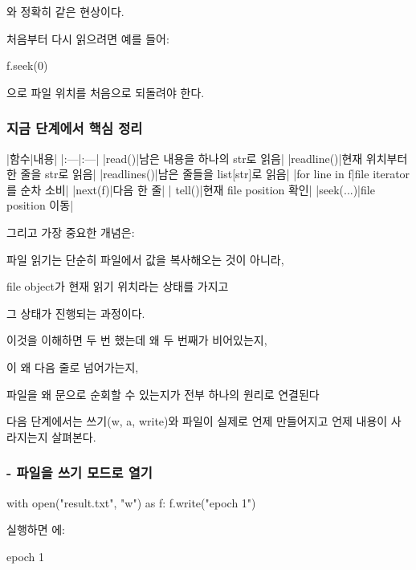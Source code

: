 와 정확히 같은 현상이다.

처음부터 다시 읽으려면 예를 들어:

\begin{dhkcode}
f.seek(0)
\end{dhkcode}

으로 파일 위치를 처음으로 되돌려야 한다.

\subsubsection{지금 단계에서 핵심 정리}

\begin{dhktable}
|함수|내용|
|:---|:---|
|read()|남은 내용을 하나의 str로 읽음|
|readline()|현재 위치부터 한 줄을 str로 읽음|
|readlines()|남은 줄들을 list[str]로 읽음|
|for line in f|file iterator를 순차 소비|
|next(f)|다음 한 줄|
| tell()|현재 file position 확인|
|seek(...)|file position 이동|
\end{dhktable}

그리고 가장 중요한 개념은:

\begin{dhknote}
\begin{dhksmry}[centered]
파일 읽기는 단순히 파일에서 값을 복사해오는 것이 아니라,

file object가 현재 읽기 위치라는 상태를 가지고 

그 상태가 진행되는 과정이다.
\end{dhksmry}
\end{dhknote}

이것을 이해하면  두 번 했는데 왜 두 번째가 비어있는지,

이 왜 다음 줄로 넘어가는지,

파일을 왜 문으로 순회할 수 있는지가 전부 하나의 원리로 연결된다

다음 단계에서는 쓰기(w, a, write)와 파일이 실제로 언제 만들어지고 언제 내용이 사라지는지 살펴본다.

\subsubsection{ - 파일을 쓰기 모드로 열기}

\begin{dhkcode}
with open("result.txt", "w") as f:
    f.write("epoch 1")
\end{dhkcode}

실행하면 에:

\begin{dhkzsh}
epoch 1
\end{dhkzsh}

